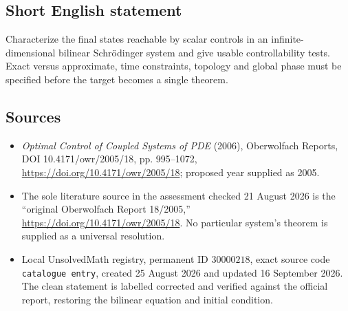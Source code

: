 \documentclass[11pt]{article}
\begin{document}
\subsection{Short English statement}
Characterize the final states reachable by scalar controls in an infinite-dimensional bilinear Schr\"odinger system and give usable controllability tests. Exact versus approximate, time constraints, topology and global phase must be specified before the target becomes a single theorem.
\subsection{Sources}
\begin{itemize}
\item \emph{Optimal Control of Coupled Systems of PDE} (2006), Oberwolfach Reports, DOI 10.4171/owr/2005/18, pp. 995--1072, \url{https://doi.org/10.4171/owr/2005/18}; proposed year supplied as 2005.
\item The sole literature source in the assessment checked 21 August 2026 is the ``original Oberwolfach Report 18/2005,'' \url{https://doi.org/10.4171/owr/2005/18}. No particular system's theorem is supplied as a universal resolution.
\item Local UnsolvedMath registry, permanent ID $30000218$, exact source code \texttt{catalogue entry}, created 25 August 2026 and updated 16 September 2026. The clean statement is labelled corrected and verified against the official report, restoring the bilinear equation and initial condition.
\end{itemize}
\end{document}
